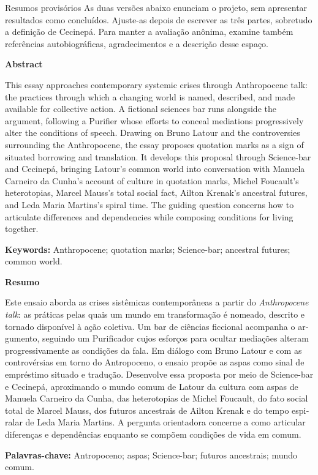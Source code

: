 \begin{orientacao}{Resumos provisórios}
As duas versões abaixo enunciam o projeto, sem apresentar resultados como
concluídos. Ajuste-as depois de escrever as três partes, sobretudo a
definição de Cecinepá. Para manter a avaliação anônima, examine também
referências autobiográficas, agradecimentos e a descrição desse espaço.
\end{orientacao}

\noindent\textbf{Abstract}\par
\noindent
This essay approaches contemporary systemic crises through Anthropocene
talk: the practices through which a changing world is named, described,
and made available for collective action. A fictional sciences bar runs
alongside the argument, following a Purifier whose efforts to conceal
mediations progressively alter the conditions of speech. Drawing on Bruno
Latour and the controversies surrounding the Anthropocene, the essay
proposes quotation marks as a sign of situated borrowing and translation.
It develops this proposal through Science-bar and Cecinepá, bringing
Latour's common world into conversation with Manuela Carneiro da Cunha's
account of culture in quotation marks, Michel Foucault's heterotopias,
Marcel Mauss's total social fact, Ailton Krenak's ancestral futures, and
Leda Maria Martins's spiral time. The guiding question concerns how to
articulate differences and dependencies while composing conditions for
living together.

\medskip
\noindent\textbf{Keywords:} Anthropocene; quotation marks; Science-bar;
ancestral futures; common world.

\begin{otherlanguage}{portuguese}
\bigskip
\noindent\textbf{Resumo}\par
\noindent
Este ensaio aborda as crises sistêmicas contemporâneas a partir do
\textit{Anthropocene talk}: as práticas pelas quais um mundo em
transformação é nomeado, descrito e tornado disponível à ação coletiva.
Um bar de ciências ficcional acompanha o argumento, seguindo um
Purificador cujos esforços para ocultar mediações alteram progressivamente
as condições da fala. Em diálogo com Bruno Latour e com as controvérsias
em torno do Antropoceno, o ensaio propõe as aspas como sinal de empréstimo
situado e tradução. Desenvolve essa proposta por meio de Science-bar e
Cecinepá, aproximando o mundo comum de Latour da cultura com aspas de
Manuela Carneiro da Cunha, das heterotopias de Michel Foucault, do fato
social total de Marcel Mauss, dos futuros ancestrais de Ailton Krenak e do
tempo espiralar de Leda Maria Martins. A pergunta orientadora concerne a
como articular diferenças e dependências enquanto se compõem condições
de vida em comum.

\medskip
\noindent\textbf{Palavras-chave:} Antropoceno; aspas; Science-bar;
futuros ancestrais; mundo comum.
\end{otherlanguage}
